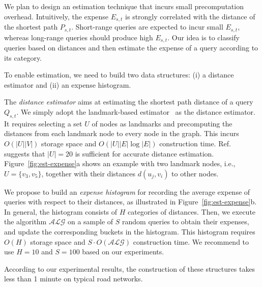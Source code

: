 \documentclass{sig-alternate}
\newcommand{\stitle}[1]{\vspace*{0.4em}\noindent{\bf #1:\/}}
\begin{document}
We plan to design an estimation technique that incurs small precomputation overhead.
Intuitively, the expense $E_{s,t}$ is strongly correlated with the distance of the shortest path $P_{s,t}$.
Short-range queries are expected to incur small $E_{s,t}$, whereas long-range queries should produce high $E_{s,t}$.
Our idea is to classify queries based on distances and then estimate the expense of a query according to its category.


\stitle{Estimation structures}
%
To enable estimation, we need to build two data structures:
(i) a distance estimator and (ii) an expense histogram.

The {\em distance estimator} aims at estimating the shortest path distance of a query $Q_{s,t}$.
We simply adopt the landmark-based estimator~\cite{Potamias09} as the distance estimator.
It requires selecting a set $U$ of nodes as landmarks and precomputing the distances from
each landmark node to every node in the graph.
This incurs $O(|U||V|)$ storage space and $O(|U||E|\log|E|)$ construction time.
Ref.~\cite{Potamias09} suggests that $|U|=20$ is sufficient for accurate distance estimation.
%
Figure~\ref{fig:est-expense}a shows an example with
two landmark nodes, i.e., $U=\{v_3,v_5\}$, together with their distances $d(u_j,v_i)$ to other nodes.


We propose to build an {\em expense histogram} for recording the average expense of queries
with respect to their distances, as illustrated in Figure~\ref{fig:est-expense}b.
In general, the histogram consists of $H$ categories of distances.
Then, we execute the algorithm $\mathcal{ALG}$ on a sample of $S$ random queries to obtain their expenses,
and update the corresponding buckets in the histogram.
This histogram requires $O(H)$ storage space and $S \cdot O(\mathcal{ALG})$ construction time.
We recommend to use $H=10$ and $S=100$ based on our experiments.


According to our experimental results, the construction of these structures takes less
than 1 minute on typical road networks.
\end{document}
